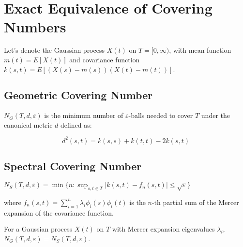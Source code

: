 \section{Exact Equivalence of Covering Numbers}

Let's denote the Gaussian process $X(t)$ on $T = [0,\infty)$, with mean function $m(t) = E[X(t)]$ and covariance function $k(s,t) = E[(X(s) - m(s))(X(t) - m(t))]$.

\subsection{Geometric Covering Number}

\begin{definition}
$N_G(T,d,\varepsilon)$ is the minimum number of $\varepsilon$-balls needed to cover $T$ under the canonical metric $d$ defined as:

\[d^2(s,t) = k(s,s) + k(t,t) - 2k(s,t)\]
\end{definition}

\subsection{Spectral Covering Number}

\begin{definition}
$N_S(T,d,\varepsilon) = \min\{n : \sup_{s,t \in T} |k(s,t) - f_n(s,t)| \leq \sqrt{\varepsilon}\}$

where $f_n(s,t) = \sum_{i=1}^n \lambda_i \phi_i(s) \phi_i(t)$ is the $n$-th partial sum of the Mercer expansion of the covariance function.
\end{definition}

\begin{theorem}
For a Gaussian process $X(t)$ on $T$ with Mercer expansion eigenvalues $\lambda_i$, $N_G(T,d,\varepsilon) = N_S(T,d,\varepsilon)$.
\end{theorem}

